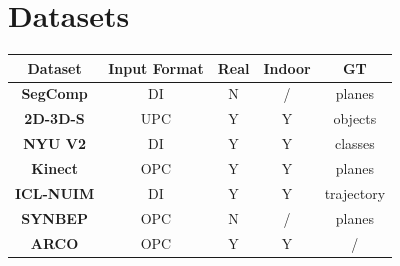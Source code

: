 \documentclass[main.tex]{subfiles}
\begin{document}
\section{Datasets}
\begin{table}[H]
    \centering
    \begin{tabular}{c|c|c|c|c}
        \textbf{Dataset}                                                                                                                                                                      & \textbf{Input Format} & \textbf{Real} & \textbf{Indoor} & \textbf{GT} \\ \hline
        \textbf{SegComp}     \cite{article}                                                                                                                                                   & DI                    & N             & /               & planes      \\
        \textbf{2D-3D-S}       \cite{armeni_cvpr16}                                                                                                                                           & UPC                   & Y             & Y               & objects     \\
        \textbf{NYU V2}      \cite{10.1007/978-3-642-33715-4_54}                                                                                                                              & DI                    & Y             & Y               & classes     \\
        \textbf{Kinect}      \cite{Oehler_Stueckler_Welle_Schulz_Behnke_2011}                                                                                                                 & OPC                   & Y             & Y               & planes      \\
        \textbf{ICL-NUIM}    \cite{handa:etal:ICRA2014}                                                                                                                                       & DI                    & Y             & Y               & trajectory  \\
        \textbf{SYNBEP}      \cite{schaefer19icra}                                                                                                                                            & OPC                   & N             & /               & planes      \\
        \textbf{ARCO}        \cite{Hidalgo-Paniagua_Vega-Rodríguez_Pavón_Ferruz_2015}                                                                                                         & OPC                   & Y             & Y               & /           \\

\end{tabular}
\end{table}
\end{document}
